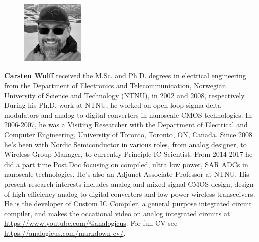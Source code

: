 
\begin{figure}
\centerline{\includegraphics[width=30mm]{wulff} }
\end{figure}
 \textbf{Carsten Wulff}
received the M.Sc. and Ph.D. degrees in
electrical engineering from the Department of Electronics and Telecommunication, Norwegian University of Science and Technology (NTNU),
in 2002 and 2008, respectively. 
During his Ph.D. work at NTNU, he worked on open-loop sigma-delta
modulators and analog-to-digital converters in nanoscale CMOS
technologies. In 2006-2007, he was a Visiting Researcher with the
Department of Electrical and Computer Engineering, University of
Toronto, Toronto, ON, Canada. Since 2008 he's been with Nordic Semiconductor in
various roles, from analog designer, to Wireless Group Manager, to currently
Principle IC Scientist. From 2014-2017 he did a part time Post.Doc focusing on
compiled, ultra low power, SAR ADCs in nanoscale technologies.
He's also an Adjunct Associate Professor at NTNU. His
present research interests includes analog and mixed-signal CMOS
design, design of high-efficiency analog-to-digital converters and
low-power wireless transceivers. He is the developer of Custom IC
Compiler, a general purpose integrated circuit compiler, and makes the
occational video on analog integrated circuits at
\url{https://www.youtube.com/@analogicus}.
For full CV see \url{https://analogicus.com/markdown-cv/}.
%
\
